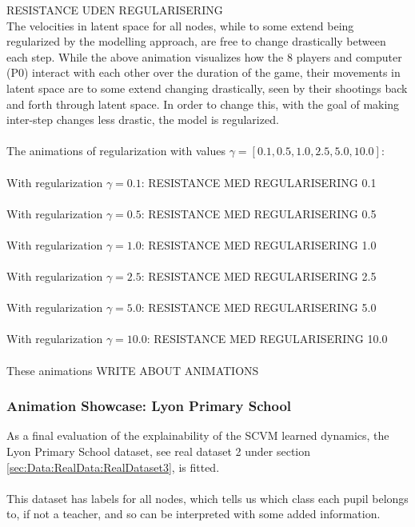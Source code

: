 RESISTANCE UDEN REGULARISERING
\\
The velocities in latent space for all nodes, while to some extend being regularized by the modelling approach, are free to change drastically between each step.
While the above animation visualizes how the 8 players and computer (P0) interact with each other over the duration of the game, their movements in latent space are to some extend changing drastically, seen by their shootings back and forth through latent space.
In order to change this, with the goal of making inter-step changes less drastic, the model is regularized.
\\\\
The animations of regularization with values $\gamma = [0.1, 0.5, 1.0, 2.5, 5.0, 10.0]$:
\\\\
With regularization $\gamma = 0.1$:
RESISTANCE MED REGULARISERING 0.1
\\\\
With regularization $\gamma = 0.5$:
RESISTANCE MED REGULARISERING 0.5
\\\\
With regularization $\gamma = 1.0$:
RESISTANCE MED REGULARISERING 1.0
\\\\
With regularization $\gamma = 2.5$:
RESISTANCE MED REGULARISERING 2.5
\\\\
With regularization $\gamma = 5.0$:
RESISTANCE MED REGULARISERING 5.0
\\\\
With regularization $\gamma = 10.0$:
RESISTANCE MED REGULARISERING 10.0
\\\\
These animations WRITE ABOUT ANIMATIONS

\subsubsection{Animation Showcase: Lyon Primary School}
\label{sec:ResearchQuestion3:Lyon}

As a final evaluation of the explainability of the SCVM learned dynamics, the Lyon Primary School dataset, see real dataset 2 under section \ref{sec:Data:RealData:RealDataset3}, is fitted.
\\\\
This dataset has labels for all nodes, which tells us which class each pupil belongs to, if not a teacher, and so can be interpreted with some added information.

